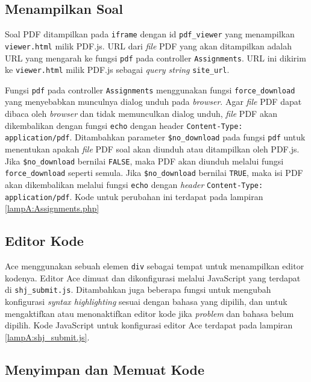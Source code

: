 \subsection{Menampilkan Soal}
\label{subsec:5:soal}

Soal PDF ditampilkan pada \verb|iframe| dengan id \verb|pdf_viewer| yang menampilkan \verb|viewer.html| milik PDF.js. URL dari \textit{file} PDF yang akan ditampilkan adalah URL yang mengarah ke fungsi \verb|pdf| pada controller \verb|Assignments|. URL ini dikirim ke \verb|viewer.html| milik PDF.js sebagai \textit{query string} \verb|site_url|.

Fungsi \verb|pdf| pada controller \verb|Assignments| menggunakan fungsi \verb|force_download| yang menyebabkan munculnya dialog unduh pada \textit{browser}. Agar \textit{file} PDF dapat dibaca oleh \textit{browser} dan tidak memunculkan dialog unduh, \textit{file} PDF akan dikembalikan dengan fungsi \verb|echo| dengan header \verb|Content-Type: application/pdf|. Ditambahkan parameter \verb|$no_download| pada fungsi \verb|pdf| untuk menentukan apakah \textit{file} PDF soal akan diunduh atau ditampilkan oleh PDF.js. Jika \verb|$no_download| bernilai \verb|FALSE|, maka PDF akan diunduh melalui fungsi \verb|force_download| seperti semula. Jika \verb|$no_download| bernilai \verb|TRUE|, maka isi PDF akan dikembalikan melalui fungsi \verb|echo| dengan \textit{header} \verb|Content-Type: application/pdf|. Kode untuk perubahan ini terdapat pada lampiran \ref{lampA:Assignments.php}

\subsection{Editor Kode}
\label{subsec:5:editor}

Ace menggunakan sebuah elemen \verb|div| sebagai tempat untuk menampilkan editor kodenya. Editor Ace dimuat dan dikonfigurasi melalui JavaScript yang terdapat di \verb|shj_submit.js|. Ditambahkan juga beberapa fungsi untuk mengubah konfigurasi \textit{syntax highlighting} sesuai dengan bahasa yang dipilih, dan untuk mengaktifkan atau menonaktifkan editor kode jika \textit{problem} dan bahasa belum dipilih. Kode JavaScript untuk konfigurasi editor Ace terdapat pada lampiran \ref{lampA:shj_submit.js}.

\subsection{Menyimpan dan Memuat Kode}
\label{subsec:5:simpan}

